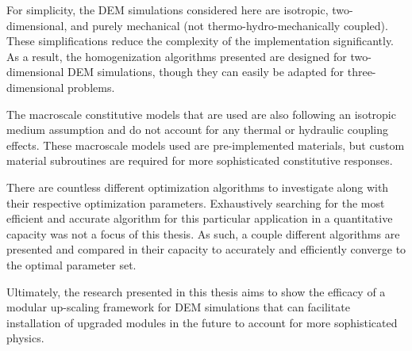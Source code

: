 For simplicity, the DEM simulations considered here are isotropic, two-dimensional, and purely mechanical (not thermo-hydro-mechanically coupled). These simplifications reduce the complexity of the implementation significantly. As a result, the homogenization algorithms presented are designed for two-dimensional DEM simulations, though they can easily be adapted for three-dimensional problems.

The macroscale constitutive models that are used are also following an isotropic medium assumption and do not account for any thermal or hydraulic coupling effects. These macroscale models used are pre-implemented materials, but custom material subroutines are required for more sophisticated constitutive responses. 

There are countless different optimization algorithms to investigate along with their respective optimization parameters. Exhaustively searching for the most efficient and accurate algorithm for this particular application in a quantitative capacity was not a focus of this thesis. As such, a couple different algorithms are presented and compared in their capacity to accurately and efficiently converge to the optimal parameter set.

Ultimately, the research presented in this thesis aims to show the efficacy of a modular up-scaling framework for DEM simulations that can facilitate installation of upgraded modules in the future to account for more sophisticated physics.
